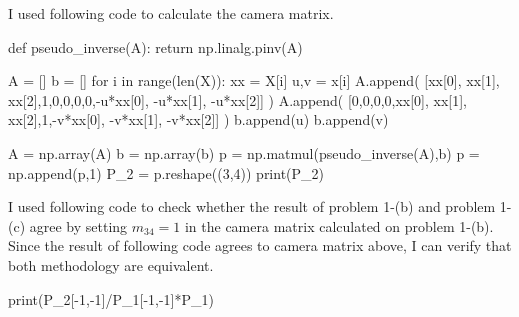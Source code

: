 \documentclass[10pt]{article}
\begin{document}
% 
I used following code to calculate the camera matrix.
\begin{python}
def pseudo_inverse(A):
    return np.linalg.pinv(A)

A = []
b = []
for i in range(len(X)):
    xx = X[i]
    u,v = x[i]
    A.append(
        [xx[0], xx[1], xx[2],1,0,0,0,0,-u*xx[0], -u*xx[1], -u*xx[2]]
    )
    A.append(
        [0,0,0,0,xx[0], xx[1], xx[2],1,-v*xx[0], -v*xx[1], -v*xx[2]]
    )
    b.append(u)
    b.append(v)

A = np.array(A)
b = np.array(b)
p = np.matmul(pseudo_inverse(A),b)
p = np.append(p,1)
P_2 = p.reshape((3,4))
print(P_2)
\end{python}
I used following code to check whether the result of problem 1-(b) and problem 1-(c) agree by setting $m_{34} = 1$ in the camera matrix calculated on problem 1-(b).
Since the result of following code agrees to camera matrix above, I can verify that both methodology are equivalent.
\begin{python}
print(P_2[-1,-1]/P_1[-1,-1]*P_1)
\end{python}
\end{document}
